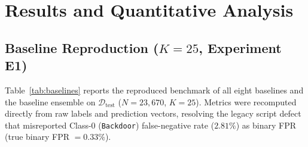 \documentclass[10pt,journal,twocolumn]{IEEEtran}
\begin{document}
\section{Results and Quantitative Analysis}

\subsection{Baseline Reproduction ($K=25$, Experiment E1)}
Table~\ref{tab:baselines} reports the reproduced benchmark of all eight baselines and the baseline ensemble on $\mathcal{D}_{\text{test}}$ ($N=23,670$, $K=25$). Metrics were recomputed directly from raw labels and prediction vectors, resolving the legacy script defect that misreported Class-0 (\texttt{Backdoor}) false-negative rate ($2.81\%$) as binary FPR (true binary FPR $=0.33\%$).
\end{document}
